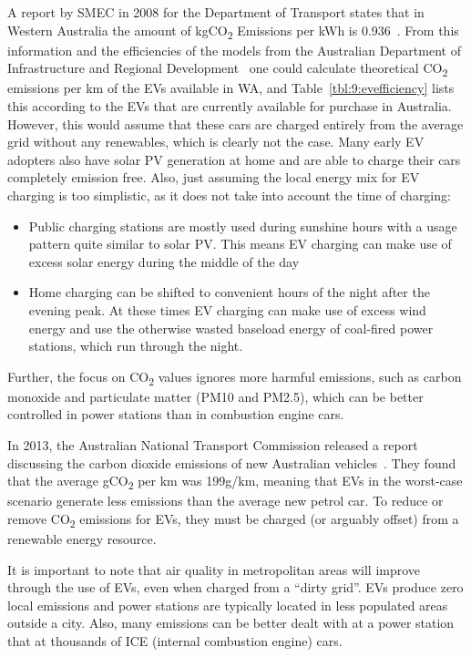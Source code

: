 A report by SMEC in 2008 for the Department of Transport states that in Western Australia the amount of kgCO\textsubscript{2} Emissions per kWh is 0.936~\cite{van_namen_green_2011}. From this information and the efficiencies of the models from the Australian Department of Infrastructure and Regional Development~\cite{department_of_infrastructure_and_regional_development_vehicle_2016} one could calculate theoretical CO\textsubscript{2} emissions per km of the EVs available in WA, and Table~\ref{tbl:9:evefficiency} lists this according to the EVs that are currently available for purchase in Australia. However, this would assume that these cars are charged entirely from the average grid without any renewables, which is clearly not the case. Many early EV adopters also have solar PV generation at home and are able to charge their cars completely emission free. Also, just assuming the local energy mix for EV charging is too simplistic, as it does not take into account the time of charging:
\begin{itemize}
	\item Public charging stations are mostly used during sunshine hours with a usage pattern quite similar to solar PV. This means EV charging can make use of excess solar energy during the middle of the day
	\item Home charging can be shifted to convenient hours of the night after the evening peak. At these times EV charging can make use of excess wind energy and use the otherwise wasted baseload energy of coal-fired power stations, which run through the night.
\end{itemize}
Further, the focus on CO\textsubscript{2} values ignores more harmful emissions, such as carbon monoxide and particulate matter (PM10 and PM2.5), which can be better controlled in power stations than in combustion engine cars.


In 2013, the Australian National Transport Commission released a report discussing the carbon dioxide emissions of new Australian vehicles~\cite{national_transport_commission_carbon_2014}. They found that the average gCO\textsubscript{2} per km was 199g/km, meaning that EVs in the worst-case scenario generate less emissions than the average new petrol car. To reduce or remove CO\textsubscript{2} emissions for EVs, they must be charged (or arguably offset) from a renewable energy resource.
 
It is important to note that air quality in metropolitan areas will improve through the use of EVs, even when charged from a “dirty grid”. EVs produce zero local emissions and power stations are typically located in less populated areas outside a city. Also, many emissions can be better dealt with at a power station that at thousands of ICE (internal combustion engine) cars.

